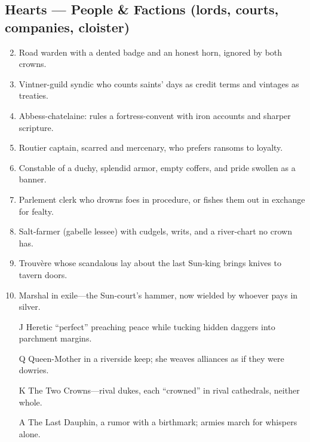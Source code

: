 \subsection*{Hearts --- People \& Factions (lords, courts, companies, cloister)}
\label{sec:vhasia-people}
\begin{enumerate}
\setcounter{enumi}{1}
\item Road warden with a dented badge and an honest horn, ignored by both crowns.
\item Vintner-guild syndic who counts saints’ days as credit terms and vintages as treaties.
\item Abbess-chatelaine: rules a fortress-convent with iron accounts and sharper scripture.
\item Routier captain, scarred and mercenary, who prefers ransoms to loyalty.
\item Constable of a duchy, splendid armor, empty coffers, and pride swollen as a banner.
\item Parlement clerk who drowns foes in procedure, or fishes them out in exchange for fealty.
\item Salt-farmer (gabelle lessee) with cudgels, writs, and a river-chart no crown has.
\item Trouvère whose scandalous lay about the last Sun-king brings knives to tavern doors.
\item Marshal in exile—the Sun-court’s hammer, now wielded by whoever pays in silver.
\item[J] Heretic “perfect” preaching peace while tucking hidden daggers into parchment margins.
\item[Q] Queen-Mother in a riverside keep; she weaves alliances as if they were dowries.
\item[K] The Two Crowns—rival dukes, each “crowned” in rival cathedrals, neither whole.
\item[A] The Last Dauphin, a rumor with a birthmark; armies march for whispers alone.
\end{enumerate}

